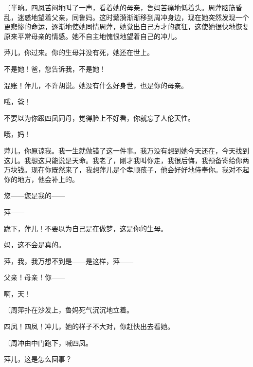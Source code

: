 {\fangsong〔半晌。四凤苦闷地叫了一声，看着她的母亲，鲁妈苦痛地低着头。周萍脑筋昏乱，迷惑地望着父亲，同鲁妈。这时蘩漪渐渐移到周冲身边，现在她突然发现一个更悲惨的命运，逐渐地使她同情周萍，她觉出自己方才的疯狂，这使她很快地恢复原来平常母亲的情感。她不自主地愧恨地望着自己的冲儿。}

萍儿，你过来。你的生母并没有死，她还在世上。

不是她！爸，您告诉我，不是她！

混账！萍儿，不许胡说。她没有什么好身世，也是你的母亲。

哦，爸！

不要以为你跟四凤同母，觉得脸上不好看，你就忘了人伦天性。

哦，妈！

萍儿，你原谅我。我一生就做错了这一件事。我万没有想到她今天还在，今天找到这儿。我想这只能说是天命。我老了，刚才我叫你走，我很后悔，我预备寄给你两万块钱。现在你既然来了，我想萍儿是个孝顺孩子，他会好好地侍奉你。我对不起你的地方，他会补上的。

您——您是我的——

萍——

跪下，萍儿！不要以为自己是在做梦，这是你的生母。

妈，这不会是真的。


萍，我，我万想不到是——是这样，萍——

父亲！母亲！你——

啊，天！

{\fangsong〔周萍扑在沙发上，鲁妈死气沉沉地立着。}

四凤！四凤！冲儿，她的样子不大对，你赶快出去看她。

{\fangsong〔周冲由中门跑下，喊四凤。}

萍儿，这是怎么回事？

